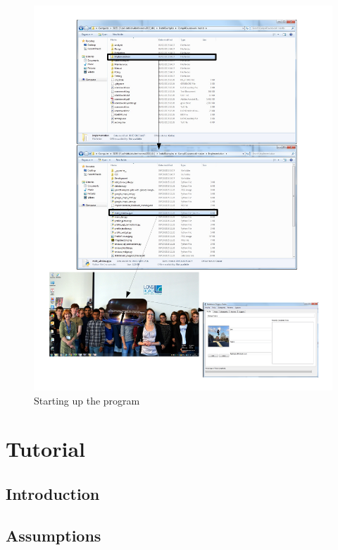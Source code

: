 \begin{figure}[H]
    \includegraphics[width=\textwidth]{./Manual/Images/RunningProgram.pdf}
    \caption{Starting up the program} \label{fig:Running Program}
\end{figure}







\section{Tutorial}

\subsection{Introduction}

\subsection{Assumptions}

